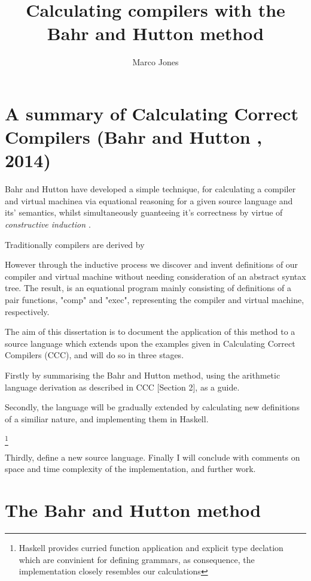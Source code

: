 \documentclass {article}
\title{Calculating compilers with the Bahr and Hutton method}
\author{Marco Jones}
\date{}
\begin{document}
\maketitle

\newcommand{\BH}{Bahr and Hutton }

\section{A summary of Calculating Correct Compilers (\BH, 2014)}
\BH have developed a simple technique, for
calculating a compiler and virtual machinea via equational reasoning
for a given source language and its' semantics, 
whilst simultaneously guanteeing it's correctness by virtue 
of \emph{constructive induction \cite{backhouse}}.

Traditionally compilers are derived by %

However through the inductive process we discover and invent definitions
of our compiler and virtual machine without needing consideration of an 
abstract syntax tree.
The result, is an equational program mainly consisting of
definitions of a pair functions,  "comp" and "exec",
representing the compiler and virtual machine, respectively.

The aim of this dissertation is to document the
application of this method
to a source language which extends upon the examples given in
Calculating Correct Compilers (CCC),
 and will do so in three stages.

Firstly by summarising the \BH method,
using the arithmetic language derivation as described in
CCC [Section 2], as a guide.

Secondly, the language will be gradually extended
by calculating new definitions of a similiar nature,
and implementing them in Haskell.

\footnote{Haskell provides curried function application
		and explicit type declation which are
		convinient for defining grammars,
		as consequence, the implementation closely
		resembles our calculations}

Thirdly, define a new source language.
Finally I will conclude with comments on space and time complexity
of the implementation, and further work.

\section{The Bahr and Hutton method}
\end{document}
